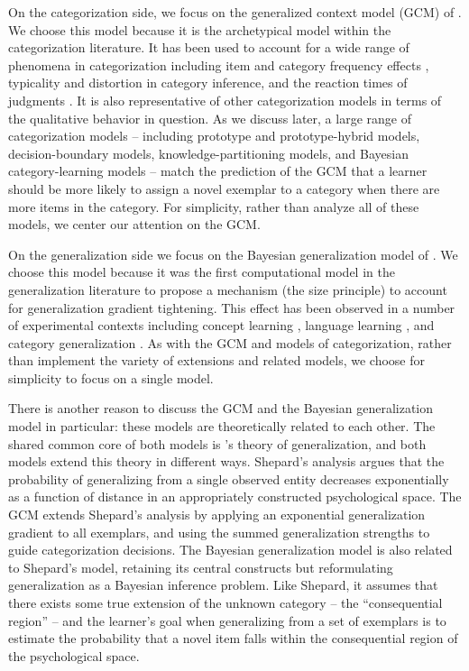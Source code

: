 \documentclass[doc,apacite]{apa6}
\newcommand{\possessivecite}[1]{\citeauthor{#1}'s \citeyear{#1}}
\begin{document}
On the categorization side, we focus on the generalized context model (GCM) of . We choose this model because it is the archetypical model within the categorization literature.
It has been used to account for a wide range of phenomena in categorization including item and category frequency effects \cite{nosofsky1988similarity, nosofsky1991tests}, typicality \cite{nosofsky1988exemplar} and distortion \cite{zaki2007high} in category inference, and the reaction times of judgments \cite{nosofsky1997exemplar}.
It is also representative of other categorization models in terms of the qualitative behavior in question. As we discuss later, a large range of categorization models -- including prototype and prototype-hybrid models, decision-boundary models, knowledge-partitioning models, and Bayesian category-learning models --  match the prediction of the GCM that a learner should be more likely to assign a novel exemplar to a category when there are more items in the category. For simplicity, rather than analyze all of these models, we center our attention on the GCM.

On the generalization side we focus on the Bayesian generalization model of . We choose this model because it was the first computational model in the generalization literature to propose a mechanism (the size principle) to account for generalization gradient tightening.
This effect has been observed in a number of experimental contexts including concept learning \cite{tenenbaum2000rules,tenenbaum1999bayesian,sanjana2003bayesian,navarroperfors2010}, language learning \cite{xu2007word, xu2007sensitivity, hsugriffiths16,lewis2016understanding,franktenenbaum2011}, and category generalization \cite{navarro2012sampling, vong2013role}.
As with the GCM and models of categorization, rather than implement the variety of extensions and related models, we choose for simplicity to focus on a single model.

There is another reason to discuss the GCM and the Bayesian generalization model in particular: these models are theoretically related to each other.
The shared common core of both models is \possessivecite{shepard1987universalsim} theory of generalization, and both models extend this theory in different ways. Shepard's analysis argues that the probability of generalizing from a single observed entity decreases exponentially as a function of distance in an appropriately constructed psychological space. The GCM extends Shepard's analysis by applying an exponential generalization gradient to all exemplars, and using the summed generalization strengths to guide categorization decisions. The Bayesian generalization model is also related to Shepard's model, retaining its central constructs but reformulating generalization as a Bayesian inference problem. Like Shepard, it assumes that there exists some true extension of the unknown category -- the ``consequential region'' -- and the learner's goal when generalizing from a set of exemplars is to estimate the probability that a novel item falls within the consequential region of the psychological space.
\end{document}
